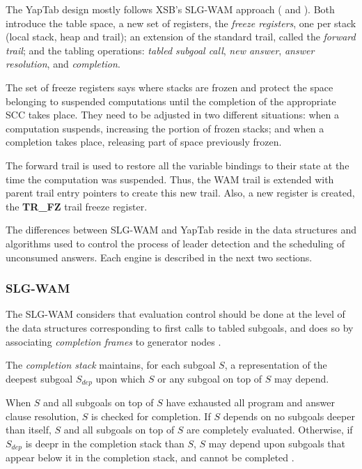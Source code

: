   The YapTab design mostly follows XSB's SLG-WAM approach (\cite{Sagonas-96} and \cite{Sagonas-98}).
  Both introduce the table space,
  a new set of registers, the \textit{freeze registers}, one per stack (local stack, heap and trail);
  an extension of the standard trail,
  called the \textit{forward trail}; and the tabling operations: \textit{tabled subgoal call},
  \textit{new answer}, \textit{answer resolution}, and \textit{completion}.
  
  The set of freeze registers says where stacks are frozen and protect the space belonging to suspended
  computations until the completion of the appropriate SCC takes place. They need to be adjusted
  in two different situations: when a computation suspends, increasing the portion of frozen stacks; and when a completion takes place,
  releasing part of space previously frozen.
  
  The forward trail is used to restore all the variable bindings to their state at the time the computation was suspended.
  Thus, the WAM trail is extended with parent trail entry pointers to create this new trail.
  Also, a new register is created, the \textbf{TR\_FZ} trail freeze register.
  
  The differences between SLG-WAM and YapTab reside in the data structures and algorithms used to control the process of leader detection
  and the scheduling of unconsumed answers. Each engine is described in the next two sections.
  
  \subsubsection{SLG-WAM}
  
  The SLG-WAM considers that evaluation control should be done at the level of the data structures
  corresponding to first calls to tabled subgoals, and does so by associating \textit{completion frames}
  to generator nodes \cite{Sagonas-98}.
  
  The \textit{completion stack} maintains, for each subgoal $S$, a representation of the deepest subgoal
  $S_{dep}$ upon which $S$ or any subgoal on top of $S$ may depend.
  
  When $S$ and all subgoals on top of $S$ have exhausted all program and answer clause resolution,
  $S$ is checked for completion. If $S$ depends on no subgoals deeper than itself, $S$ and
  all subgoals on top of $S$ are completely evaluated. Otherwise, if $S_{dep}$ is deepr in the completion
  stack than $S$, $S$ may depend upon subgoals that appear below it in the completion stack, and cannot be completed \cite{Sagonas-98}.
  
